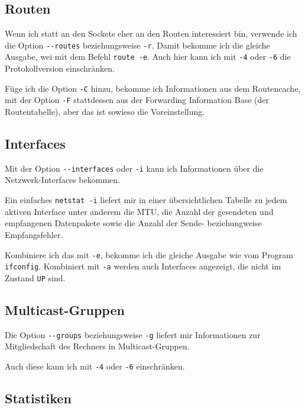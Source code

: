 \begin{normaltext}
  \subsection{Routen}
  \label{sec:netz-werkzeuge-netstat-routen}

  Wenn ich statt an den Sockets eher an den Routen interessiert bin, verwende
  ich die Option \verb?--routes? beziehungsweise \verb?-r?. Damit bekomme ich
  die gleiche Ausgabe, wei mit dem Befehl \verb?route -e?. Auch hier kann ich
  mit \verb?-4? oder \verb?-6? die Protokollversion einschränken.

  Füge ich die Option \verb?-C? hinzu, bekomme ich Informationen aus dem
  Routencache, mit der Option \verb?-F? stattdessen aus der Forwarding
  Information Base (der Routentabelle), aber das ist sowieso die
  Voreinstellung.

  \subsection{Interfaces}
  \label{sec:netz-werkzeuge-netstat-interfaces}

  Mit der Option \verb?--interfaces? oder \verb?-i? kann ich Informationen
  über die Netzwerk-Interfaces bekommen.

  Ein einfaches \verb?netstat -i? liefert mir in einer übersichtlichen Tabelle
  zu jedem aktiven Interface unter anderem die MTU, die Anzahl der gesendeten
  und empfangenen Datenpakete sowie die Anzahl der Sende- beziehungweise
  Empfangsfehler.

  Kombiniere ich das mit \verb?-e?, bekomme ich die gleiche Ausgabe wie vom
  Program \verb?ifconfig?. Kombiniert mit \verb?-a? werden auch Interfaces
  angezeigt, die nicht im Zustand \verb?UP? sind.

  \subsection{Multicast-Gruppen}
  \label{sec:netz-werkzeuge-netstat-groups}
  Die Option \verb?--groups? beziehungsweise \verb?-g? liefert mir
  Informationen zur Mitgliedschaft des Rechners in Multicast-Gruppen.

  Auch diese kann ich mit \verb?-4? oder \verb?-6? einschränken.

  \subsection{Statistiken}
  \label{sec:netz-werkzeuge-netstat-statistics}


\end{normaltext}
